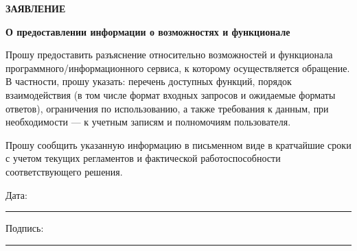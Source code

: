 \documentclass[12pt]{article}
\begin{document}
\begin{center}
\textbf{\LARGE ЗАЯВЛЕНИЕ}
\end{center}

\vspace{1cm}




{\noindent\textbf{О предоставлении информации о возможностях и функционале}}

\vspace{0.5cm}

Прошу предоставить разъяснение относительно возможностей и функционала программного/информационного сервиса, к которому осуществляется обращение. В частности, прошу указать: перечень доступных функций, порядок взаимодействия (в том числе формат входных запросов и ожидаемые форматы ответов), ограничения по использованию, а также требования к данным, при необходимости — к учетным записям и полномочиям пользователя.

Прошу сообщить указанную информацию в письменном виде в кратчайшие сроки с учетом текущих регламентов и фактической работоспособности соответствующего решения.

\vfill

\noindent
Дата: \rule{5cm}{0.4pt} \hfill Подпись: \rule{5cm}{0.4pt}
\end{document}
